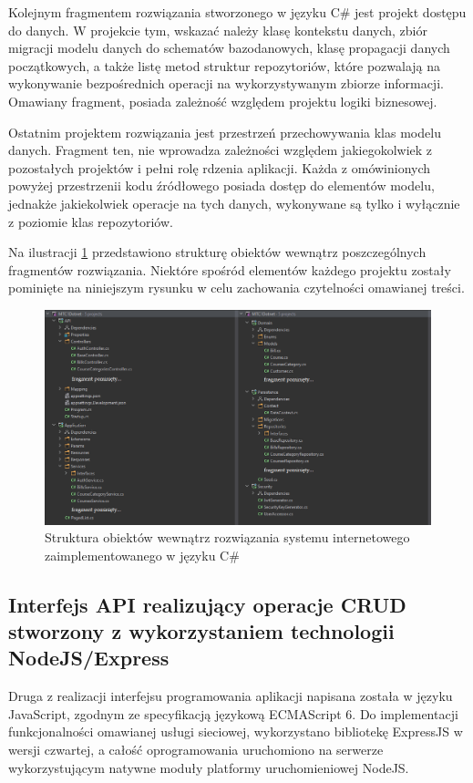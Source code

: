 Kolejnym fragmentem rozwiązania stworzonego w języku C\# jest projekt dostępu do danych. W projekcie tym, wskazać należy klasę kontekstu danych, zbiór migracji modelu danych do schematów bazodanowych, klasę propagacji danych początkowych, a także listę metod struktur repozytoriów, które pozwalają na wykonywanie bezpośrednich operacji na wykorzystywanym zbiorze informacji. Omawiany fragment, posiada zależność względem projektu logiki biznesowej.

Ostatnim projektem rozwiązania jest przestrzeń przechowywania klas modelu danych. Fragment ten, nie wprowadza zależności względem jakiegokolwiek z pozostałych projektów i pełni rolę rdzenia aplikacji. Każda z omówinionych powyżej przestrzenii kodu źródłowego posiada dostęp do elementów modelu, jednakże jakiekolwiek operacje na tych danych, wykonywane są tylko i wyłącznie z poziomie klas repozytoriów.

Na ilustracji \ref{fig:struktura-plikow-dotnet} przedstawiono strukturę obiektów wewnątrz poszczególnych fragmentów rozwiązania. Niektóre spośród elementów każdego projektu zostały pominięte na niniejszym rysunku w celu zachowania czytelności omawianej treści.

\begin{figure}[ht]
    \centering
     \includegraphics[width=\linewidth]{rys04/struktura-plikow-dotnet.png}
    \caption{Struktura obiektów wewnątrz rozwiązania systemu internetowego zaimplementowanego w języku C\#}
    \label{fig:struktura-plikow-dotnet}
\end{figure}
\subsection*{Interfejs API realizujący operacje CRUD stworzony z wykorzystaniem technologii NodeJS/Express}
Druga z realizacji interfejsu programowania aplikacji napisana została w języku JavaScript, zgodnym ze specyfikacją językową ECMAScript 6. Do implementacji funkcjonalności omawianej usługi sieciowej, wykorzystano bibliotekę ExpressJS w wersji czwartej, a całość oprogramowania uruchomiono na serwerze wykorzystującym natywne moduły platformy uruchomieniowej NodeJS.

